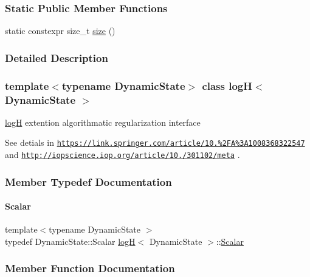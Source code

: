 \subsubsection*{Static Public Member Functions}
\begin{DoxyCompactItemize}
\item 
static constexpr size\+\_\+t \mbox{\hyperlink{classlog_h_a94f9577ea2cc32d422ebf078e123480b}{size}} ()
\end{DoxyCompactItemize}


\subsubsection{Detailed Description}
\subsubsection*{template$<$typename Dynamic\+State$>$\newline
class log\+H$<$ Dynamic\+State $>$}

\mbox{\hyperlink{classlog_h}{logH}} extention algorithmatic regularization interface 

See detials in \href{https://link.springer.com/article/10.1023%2FA%3A1008368322547}{\tt https\+://link.\+springer.\+com/article/10.\+1023\%2\+F\+A\%3\+A1008368322547} and \href{http://iopscience.iop.org/article/10.1086/301102/meta}{\tt http\+://iopscience.\+iop.\+org/article/10.\+1086/301102/meta} . 

\subsubsection{Member Typedef Documentation}
\mbox{\label{classlog_h_a3c5a69c2908971aa6cd8ff82845418d0}} 
\paragraph{\texorpdfstring{Scalar}{Scalar}}
{\footnotesize\ttfamily template$<$typename Dynamic\+State $>$ \\
typedef Dynamic\+State\+::\+Scalar \mbox{\hyperlink{classlog_h}{logH}}$<$ Dynamic\+State $>$\+::\mbox{\hyperlink{classlog_h_a3c5a69c2908971aa6cd8ff82845418d0}{Scalar}}}



\subsubsection{Member Function Documentation}
\mbox{\label{classlog_h_a57fa85fad38dae198ec4eadd757d4f40}} 
